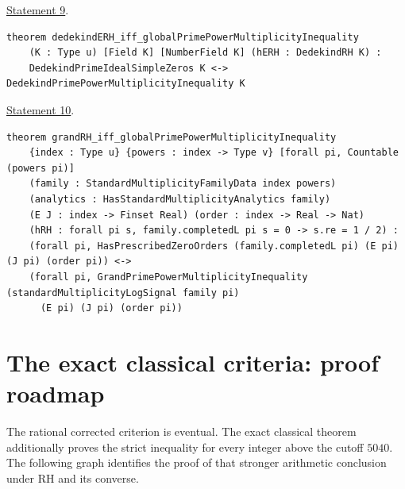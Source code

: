\documentclass[11pt]{amsart}
\theoremstyle{definition}
\theoremstyle{remark}
\numberwithin{equation}{section}
\newcommand{\repositoryurl}{https://github.com/kimihiro64/Robin1984}
\newcommand{\proofrevision}{b359826e62c50b6cef55db4b2fcab793232498cc}
\begin{document}
{\noindent\begin{minipage}{\linewidth}
\noindent\href{\repositoryurl/blob/\proofrevision/Challenge.lean\#L415-L417}{Statement 9}.
\begin{verbatim}
theorem dedekindERH_iff_globalPrimePowerMultiplicityInequality
    (K : Type u) [Field K] [NumberField K] (hERH : DedekindRH K) :
    DedekindPrimeIdealSimpleZeros K <-> DedekindPrimePowerMultiplicityInequality K
\end{verbatim}
\end{minipage}\par\smallskip

\noindent\begin{minipage}{\linewidth}
\noindent\href{\repositoryurl/blob/\proofrevision/Challenge.lean\#L534-L542}{Statement 10}.
\begin{verbatim}
theorem grandRH_iff_globalPrimePowerMultiplicityInequality
    {index : Type u} {powers : index -> Type v} [forall pi, Countable (powers pi)]
    (family : StandardMultiplicityFamilyData index powers)
    (analytics : HasStandardMultiplicityAnalytics family)
    (E J : index -> Finset Real) (order : index -> Real -> Nat)
    (hRH : forall pi s, family.completedL pi s = 0 -> s.re = 1 / 2) :
    (forall pi, HasPrescribedZeroOrders (family.completedL pi) (E pi) (J pi) (order pi)) <->
    (forall pi, GrandPrimePowerMultiplicityInequality (standardMultiplicityLogSignal family pi)
      (E pi) (J pi) (order pi))
\end{verbatim}
\end{minipage}\par\smallskip
}

\section{The exact classical criteria: proof roadmap}\label{sec:informal}

The rational corrected criterion is eventual. The exact classical
theorem additionally proves the strict inequality for every integer
above the cutoff \(5040\). The following graph identifies the proof
of that stronger arithmetic conclusion under RH and its converse.
\end{document}

